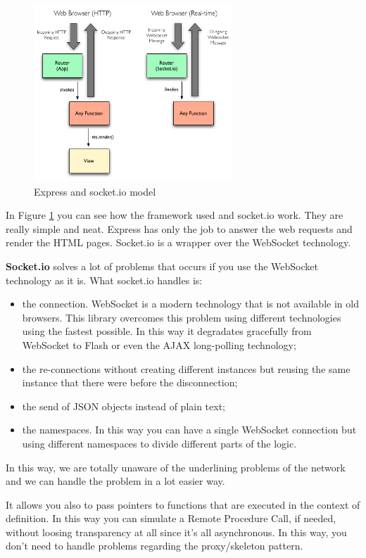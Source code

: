 \begin{figure}[H]
\centering %
\includegraphics[height=250px]{img/express.png}
\caption{Express and socket.io model}
\label{fig:expressSocketio}
\end{figure}

In Figure \ref{fig:expressSocketio} you can see how the framework used and socket.io work. They are really simple and neat. Express has only the job to answer the web requests and render the HTML pages. Socket.io is a wrapper over the WebSocket technology.

\textbf{Socket.io} solves a lot of problems that occurs if you use the WebSocket technology as it is. What socket.io handles is:
\begin{itemize}
\item the connection. WebSocket is a modern technology that is not available in old browsers. This library overcomes this problem using different technologies using the fastest possible. In this way it degradates gracefully from WebSocket to Flash or even the AJAX long-polling technology;
\item the re-connections without creating different instances but reusing the same instance that there were before the disconnection;
\item the send of JSON objects instead of plain text;
\item the namespaces. In this way you can have a single WebSocket connection but using different namespaces to divide different parts of the logic.
\end{itemize}

In this way, we are totally unaware of the underlining problems of the network and we can handle the problem in a lot easier way.

It allows you also to pass pointers to functions that are executed in the context of definition. In this way you can simulate a Remote Procedure Call, if needed, without loosing transparency at all since it's all asynchronous. In this way, you don't need to handle problems regarding the proxy/skeleton pattern.


